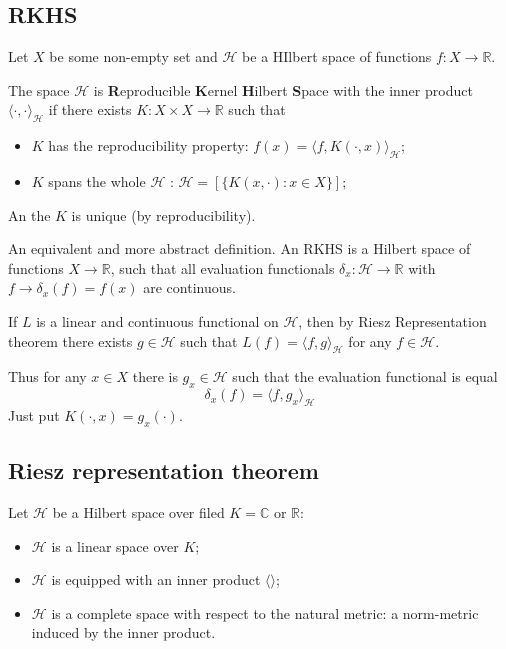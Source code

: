 \documentclass[a4paper]{article}
\newcommand{\Real}{\mathbb{R}}
\newcommand{\Cplx}{\mathbb{C}}
\newcommand{\Hcal}{\mathcal{H}}
\begin{document}

\subsection{RKHS} %
\label{sub:rkhs}

Let $X$ be some non-empty set and $\Hcal$ be a HIlbert space of functions $f:X\to\Real$.

The space $\Hcal$ is \textbf{R}eproducible \textbf{K}ernel \textbf{H}ilbert \textbf{S}pace
with the inner product $\langle\cdot, \cdot\rangle_\Hcal$ if there exists $K:X\times X\to \Real$
such that \begin{itemize}
	\item $K$ has the reproducibility property: $f(x) = \langle f, K(\cdot, x)\rangle_\Hcal$;
	\item $K$ spans the whole $\Hcal$ : $\Hcal = [ \{ K(x,\cdot) : x\in X\}]$;
\end{itemize}
An the $K$ is unique (by reproducibility).

An equivalent and more abstract definition.
An RKHS is a Hilbert space of functions $X\to \Real$, such that all evaluation functionals
$\delta_x:\Hcal\to\Real$ with $f\to \delta_x(f) = f(x)$ are continuous.

If $L$ is a linear and continuous functional on $\Hcal$, then by Riesz Representation theorem
there exists $g\in \Hcal$ such that $L(f) = \langle f,g\rangle_\Hcal$ for any $f\in \Hcal$.

Thus for any $x\in X$ there is $g_x\in \Hcal$ such that the evaluation functional is equal
\[ \delta_x(f) = \langle f, g_x\rangle_\Hcal \]
Just put $K(\cdot,x) = g_x(\cdot)$.


\subsection{Riesz representation theorem} %
\label{sub:riesz_representation_theorem}

Let $\Hcal$ be a Hilbert space over filed $K = \Cplx$ or $\Real$:
\begin{itemize}
	\item $\Hcal$ is a linear space over $K$;
	\item $\Hcal$ is equipped with an inner product $\langle\rangle$;
	\item $\Hcal$ is a complete space with respect to the natural metric:
	a norm-metric induced by the inner product.
\end{itemize}
\end{document}
